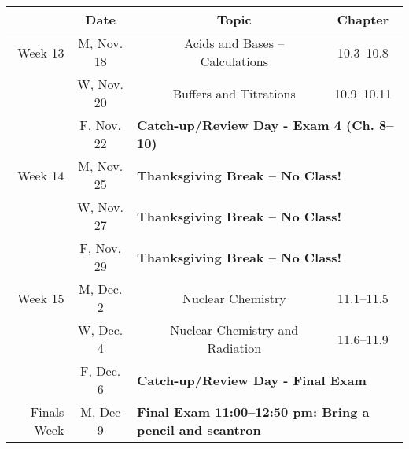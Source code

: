 \documentclass[12pt, letterpaper]{article}
\begin{document}
\noindent
\begin{tabular}{rcccc}
& Date && Topic & Chapter\\
\midrule
Week 13 & M, Nov. 18&& Acids and Bases -- Calculations & 10.3--10.8\\
& W, Nov. 20&& Buffers and Titrations & 10.9--10.11\\
& F, Nov. 22& \multicolumn{3}{l}{\textbf{Catch-up/Review Day - Exam 4 (Ch. 8--10)}}\\
\midrule
Week 14 & M, Nov. 25& \multicolumn{3}{l}{\textbf{Thanksgiving Break -- No Class!}}\\
& W, Nov. 27& \multicolumn{3}{l}{\textbf{Thanksgiving Break -- No Class!}}\\
& F, Nov. 29& \multicolumn{3}{l}{\textbf{Thanksgiving Break -- No Class!}}\\
\midrule
Week 15 & M, Dec. 2&& Nuclear Chemistry & 11.1--11.5\\
& W, Dec. 4&& Nuclear Chemistry and Radiation & 11.6--11.9\\
& F, Dec. 6& \multicolumn{3}{l}{\textbf{Catch-up/Review Day - Final Exam}}\\
\midrule
Finals Week& M, Dec 9& \multicolumn{3}{l}{\textbf{Final Exam 11:00--12:50 pm: Bring a pencil and scantron}}\\
\end{tabular}
\end{document}
